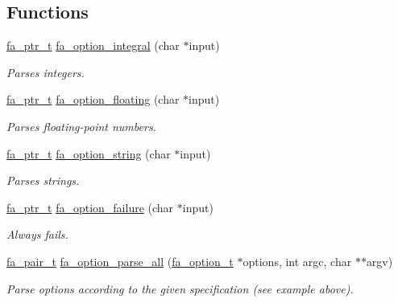 \subsection*{Functions}
\begin{DoxyCompactItemize}
\item 
\hyperlink{group___fa_ga915ddeae99ad7568b273d2b876425197}{fa\-\_\-ptr\-\_\-t} \hyperlink{group___fa_option_ga9ba72e31cecff0d13f4ad97a76f84c84}{fa\-\_\-option\-\_\-integral} (char $\ast$input)
\begin{DoxyCompactList}\small\item\em Parses integers. \end{DoxyCompactList}\item 
\hyperlink{group___fa_ga915ddeae99ad7568b273d2b876425197}{fa\-\_\-ptr\-\_\-t} \hyperlink{group___fa_option_gaf40e446b8873176ee62f74be2822e1e7}{fa\-\_\-option\-\_\-floating} (char $\ast$input)
\begin{DoxyCompactList}\small\item\em Parses floating-\/point numbers. \end{DoxyCompactList}\item 
\hyperlink{group___fa_ga915ddeae99ad7568b273d2b876425197}{fa\-\_\-ptr\-\_\-t} \hyperlink{group___fa_option_ga8bb94c18d6373f7245188120dcb70562}{fa\-\_\-option\-\_\-string} (char $\ast$input)
\begin{DoxyCompactList}\small\item\em Parses strings. \end{DoxyCompactList}\item 
\hyperlink{group___fa_ga915ddeae99ad7568b273d2b876425197}{fa\-\_\-ptr\-\_\-t} \hyperlink{group___fa_option_gaf46a405a8c9ed29f3f8177e189262425}{fa\-\_\-option\-\_\-failure} (char $\ast$input)
\begin{DoxyCompactList}\small\item\em Always fails. \end{DoxyCompactList}\item 
\hyperlink{group___fa_pair_gac2b2e58c230bac4f8a63ef6c05072680}{fa\-\_\-pair\-\_\-t} \hyperlink{group___fa_option_gaf74fe1a41763c353bf8fa0ed7f4259c6}{fa\-\_\-option\-\_\-parse\-\_\-all} (\hyperlink{structfa__option__t}{fa\-\_\-option\-\_\-t} $\ast$options, int argc, char $\ast$$\ast$argv)
\begin{DoxyCompactList}\small\item\em Parse options according to the given specification (see example above). \end{DoxyCompactList}\item 
$$
\end{DoxyCompactItemize}
